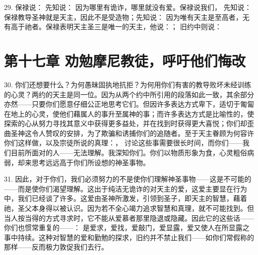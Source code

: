 29. 保禄说： 先知说： 因为哪里有诡诈，哪里就没有爱。保禄说我们， 先知说：保禄教导圣神就是天主，因此不是受造物；先知说： 因为唯有天主是至高者，无有高于祂者。保禄表明天主圣三是唯一的天主，他说：； 旧约中则说：\par


\section{第十七章  劝勉摩尼教徒，呼吁他们悔改}

30. 你们还想要什么？为何愚昧固执地抗拒？为何用你们有害的教导败坏未经训练的心灵？两约的天主是同一位。因为从两个约中所引用的段落如此一致，其余部分亦然——只要你们愿意仔细公正地思考它们。但因许多表达方式卑下，适切于匍匐在地上的心灵，使他们藉属人的事升至属神的事；而许多表达方式是比喻性的，使探索的心从努力寻找其意义中获得更多益处，并在找到时获得更大喜悦；你们却歪曲圣神这令人赞叹的安排，为了欺骗和诱捕你们的追随者。至于天主眷顾为何容许你们这样做，以及宗徒所说的真理：， 讨论这些事需要很长时间，而你们——我们目前所面对的人——无法理解。我深知你们。你们以物质形象为食，心灵粗俗病弱，却来思考远远高于你们所设想的神圣事物。\par

31. 因此，对于你们，我们必须努力的不是使你们理解神圣事物——这是不可能的——而是使你们渴望理解。这出于纯洁无诡诈的对天主的爱，这爱主要显在行为中，我们已经谈了许多。这爱由圣神所激发，引领到圣子，即天主的智慧，藉着祂，圣父本身得以被认识。因为若不全心竭力追求智慧和真理，就不可能找到。但当人按当得的方式寻求时，它不能从爱慕者那里隐退或隐藏。因此它的这些话——你们也惯常重复的——：  是爱求，爱找，爱敲门，爱显露，爱又使人在所显露之事中持续。这种对智慧的爱和勤勉的探求，旧约并不禁止我们——如你们常假称的那样——反而极力敦促我们去行。\par

